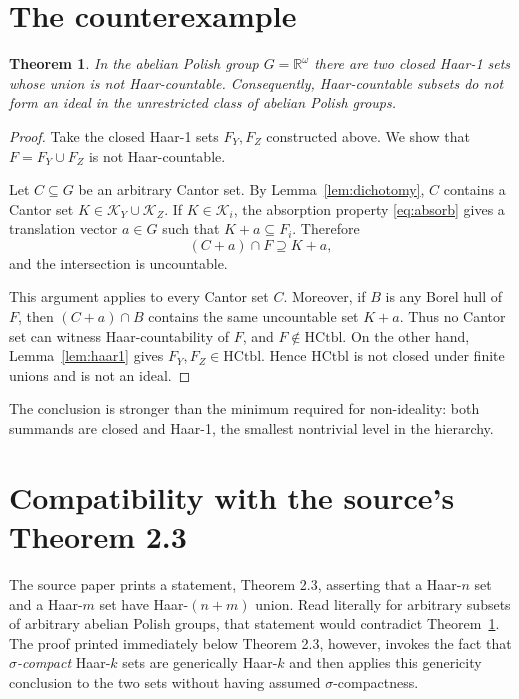 \documentclass[11pt]{article}
\newtheorem{theorem}{Theorem}
\newcommand{\R}{\mathbb R}
\newcommand{\cK}{\mathscr K}
\newcommand{\HC}{\mathrm{HCtbl}}
\begin{document}
\section{The counterexample}

\begin{theorem}\label{thm:main}
In the abelian Polish group $G=\R^\omega$ there are two closed Haar-1 sets
whose union is not Haar-countable.  Consequently, Haar-countable subsets do
not form an ideal in the unrestricted class of abelian Polish groups.
\end{theorem}

\begin{proof}
Take the closed Haar-1 sets $F_Y,F_Z$ constructed above.  We show that
$F=F_Y\cup F_Z$ is not Haar-countable.

Let $C\subseteq G$ be an arbitrary Cantor set.  By
Lemma~\ref{lem:dichotomy}, $C$ contains a Cantor set
$K\in\cK_Y\cup\cK_Z$.  If $K\in\cK_i$, the absorption property
\eqref{eq:absorb} gives a translation vector $a\in G$ such that
$K+a\subseteq F_i$.  Therefore
\[
          (C+a)\cap F\supseteq K+a,
\]
and the intersection is uncountable.

This argument applies to every Cantor set $C$.  Moreover, if $B$ is any
Borel hull of $F$, then $(C+a)\cap B$ contains the same uncountable set
$K+a$.  Thus no Cantor set can witness Haar-countability of $F$, and
$F\notin\HC$.  On the other hand, Lemma~\ref{lem:haar1} gives
$F_Y,F_Z\in\HC$.  Hence $\HC$ is not closed under finite unions and is not an
ideal.
\end{proof}

The conclusion is stronger than the minimum required for non-ideality: both
summands are closed and Haar-1, the smallest nontrivial level in the hierarchy.

\section{Compatibility with the source's Theorem 2.3}
\label{sec:compatibility}

The source paper prints a statement, Theorem 2.3, asserting that a Haar-$n$
set and a Haar-$m$ set have Haar-$(n+m)$ union.  Read literally for arbitrary
subsets of arbitrary abelian Polish groups, that statement would contradict
Theorem~\ref{thm:main}.  The proof printed immediately below Theorem 2.3,
however, invokes the fact that \emph{$\sigma$-compact} Haar-$k$ sets are
generically Haar-$k$ and then applies this genericity conclusion to the two
sets without having assumed $\sigma$-compactness.
\end{document}
